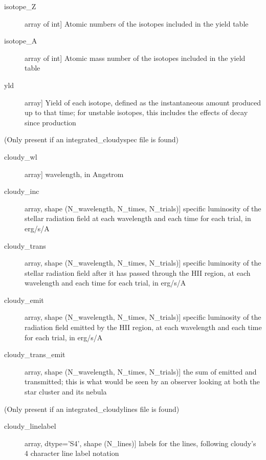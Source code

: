 \documentclass[letterpaper,10pt,english]{sphinxmanual}
\begin{document}
\begin{fulllineitems}
\begin{description}
\begin{description}
\item[{isotope\_Z}] \leavevmode{[}array of int{]}
Atomic numbers of the isotopes included in the yield table

\item[{isotope\_A}] \leavevmode{[}array of int{]}
Atomic mass number of the isotopes included in the yield table

\item[{yld}] \leavevmode{[}array{]}
Yield of each isotope, defined as the instantaneous amount
produced up to that time; for unstable isotopes, this
includes the effects of decay since production

\end{description}

(Only present if an integrated\_cloudyspec file is found)
\begin{description}
\item[{cloudy\_wl}] \leavevmode{[}array{]}
wavelength, in Angstrom

\item[{cloudy\_inc}] \leavevmode{[}array, shape (N\_wavelength, N\_times, N\_trials){]}
specific luminosity of the stellar radiation field at each
wavelength and each time for each trial, in erg/s/A

\item[{cloudy\_trans}] \leavevmode{[}array, shape (N\_wavelength, N\_times, N\_trials){]}
specific luminosity of the stellar radiation field after it has
passed through the HII region, at each wavelength and each time
for each trial, in erg/s/A

\item[{cloudy\_emit}] \leavevmode{[}array, shape (N\_wavelength, N\_times, N\_trials){]}
specific luminosity of the radiation field emitted by the HII
region, at each wavelength and each time for each trial, in
erg/s/A

\item[{cloudy\_trans\_emit}] \leavevmode{[}array, shape (N\_wavelength, N\_times, N\_trials){]}
the sum of emitted and transmitted; this is what would be seen
by an observer looking at both the star cluster and its nebula

\end{description}

(Only present if an integrated\_cloudylines file is found)
\begin{description}
\item[{cloudy\_linelabel}] \leavevmode{[}array, dtype='S4', shape (N\_lines){]}
labels for the lines, following cloudy's 4 character line label
notation


\end{description}
\end{description}
\end{fulllineitems}
\end{document}
